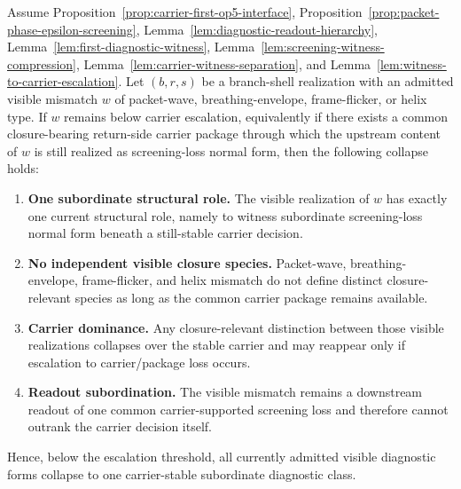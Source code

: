 \begin{theorem}
\label{thm:carrier-stable-diagnostic-collapse}
Assume Proposition~\ref{prop:carrier-first-op5-interface}, Proposition~\ref{prop:packet-phase-epsilon-screening}, Lemma~\ref{lem:diagnostic-readout-hierarchy}, Lemma~\ref{lem:first-diagnostic-witness}, Lemma~\ref{lem:screening-witness-compression}, Lemma~\ref{lem:carrier-witness-separation}, and Lemma~\ref{lem:witness-to-carrier-escalation}. Let $(b,r,s)$ be a branch-shell realization with an admitted visible mismatch $w$ of packet-wave, breathing-envelope, frame-flicker, or helix type. If $w$ remains below carrier escalation, equivalently if there exists a common closure-bearing return-side carrier package through which the upstream content of $w$ is still realized as screening-loss normal form, then the following collapse holds:
\begin{enumerate}[leftmargin=2em,label=(\roman*)]
\item \textbf{One subordinate structural role.} The visible realization of $w$ has exactly one current structural role, namely to witness subordinate screening-loss normal form beneath a still-stable carrier decision.
\item \textbf{No independent visible closure species.} Packet-wave, breathing-envelope, frame-flicker, and helix mismatch do not define distinct closure-relevant species as long as the common carrier package remains available.
\item \textbf{Carrier dominance.} Any closure-relevant distinction between those visible realizations collapses over the stable carrier and may reappear only if escalation to carrier/package loss occurs.
\item \textbf{Readout subordination.} The visible mismatch remains a downstream readout of one common carrier-supported screening loss and therefore cannot outrank the carrier decision itself.
\end{enumerate}
Hence, below the escalation threshold, all currently admitted visible diagnostic forms collapse to one carrier-stable subordinate diagnostic class.
\end{theorem}

